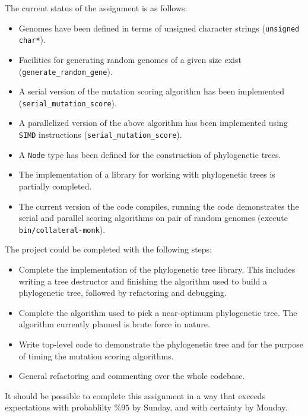 \documentclass{article}
\begin{document}


The current status of the assignment is as follows:

\begin{itemize}
        \item Genomes have been defined in terms of unsigned character strings ({\tt unsigned char*}).
        \item Facilities for generating random genomes of a given size exist ({\tt generate\_random\_gene}).
        \item A serial version of the mutation scoring algorithm has been implemented ({\tt serial\_mutation\_score}).
        \item A parallelized version of the above algorithm has been implemented using {\tt SIMD} instructions ({\tt serial\_mutation\_score}).
        \item A {\tt Node} type has been defined for the construction of phylogenetic trees.
        \item The implementation of a library for working with phylogenetic trees is partially completed.
        \item The current version of the code compiles, running the code demonstrates the serial and parallel scoring algorithms on pair of random genomes (execute {\tt bin/collateral-monk}).
\end{itemize}


The project could be completed with the following steps:

\begin{itemize}
        \item Complete the implementation of the phylogenetic tree library. This includes writing a tree destructor and finishing the algorithm used to build a phylogenetic tree, followed by refactoring and debugging.
        \item Complete the algorithm used to pick a near-optimum phylogenetic tree. The algorithm currently planned is brute force in nature.
        \item Write top-level code to demonstrate the phylogenetic tree and for the purpose of timing the mutation scoring algorithms.
        \item General refactoring and commenting over the whole codebase.
\end{itemize}


It should be possible to complete this assignment in a way that exceeds expectations with probablilty \(\% 95\) by Sunday, and with certainty by Monday.
\end{document}
